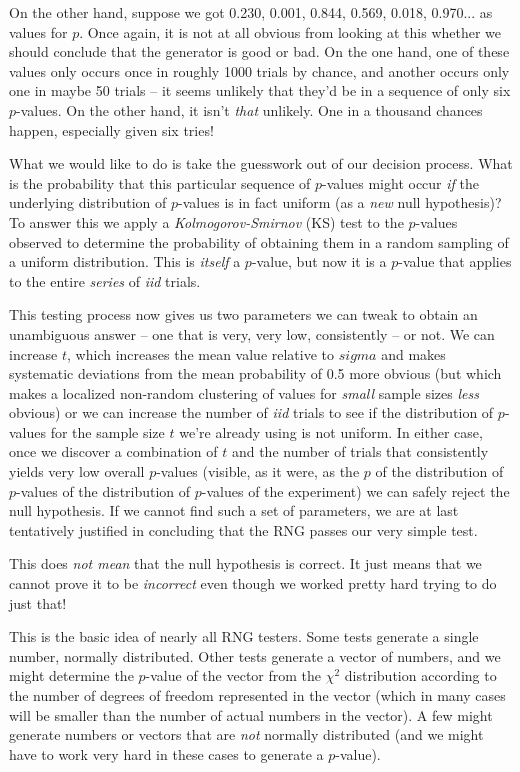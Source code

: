 \documentclass[12pt]{article}
\begin{document}
On the other hand, suppose we got 0.230, 0.001, 0.844, 0.569, 0.018,
0.970... as values for $p$.  Once again, it is not at all obvious from
looking at this whether we should conclude that the generator is good or
bad.  On the one hand, one of these values only occurs once in roughly
1000 trials by chance, and another occurs only one in maybe 50 trials --
it seems unlikely that they'd be in a sequence of only six $p$-values.
On the other hand, it isn't {\em that} unlikely.  One in a thousand
chances happen, especially given six tries!

What we would like to do is take the guesswork out of our decision
process.  What is the probability that this particular sequence of
$p$-values might occur {\em if} the underlying distribution of
$p$-values is in fact uniform (as a {\em new} null hypothesis)?  To
answer this we apply a {\em Kolmogorov-Smirnov} (KS) test to the
$p$-values observed to determine the probability of obtaining them in a
random sampling of a uniform distribution.  This is {\em itself} a
$p$-value, but now it is a $p$-value that applies to the entire {\em
series} of {\em iid} trials.

This testing process now gives us two parameters we can tweak to obtain
an unambiguous answer -- one that is very, very low, consistently -- or
not.  We can increase $t$, which increases the mean value relative to
$sigma$ and makes systematic deviations from the mean probability of 0.5
more obvious (but which makes a localized non-random clustering of
values for {\em small} sample sizes {\em less} obvious) or we can
increase the number of {\em iid} trials to see if the distribution of
$p$-values for the sample size $t$ we're already using is not uniform.
In either case, once we discover a combination of $t$ and the number of
trials that consistently yields very low overall $p$-values (visible, as
it were, as the $p$ of the distribution of $p$-values of the
distribution of $p$-values of the experiment) we can safely reject the
null hypothesis.  If we cannot find such a set of parameters, we are at
last tentatively justified in concluding that the RNG passes our very
simple test.  

This does {\em not mean} that the null hypothesis is correct.  It just
means that we cannot prove it to be {\em incorrect} even though we
worked pretty hard trying to do just that!

This is the basic idea of nearly all RNG testers.  Some tests generate a
single number, normally distributed.  Other tests generate a vector of
numbers, and we might determine the $p$-value of the vector from the
$\chi^2$ distribution according to the number of degrees of freedom
represented in the vector (which in many cases will be smaller than the
number of actual numbers in the vector).  A few might generate numbers
or vectors that are {\em not} normally distributed (and we might have to
work very hard in these cases to generate a $p$-value).  
\end{document}
